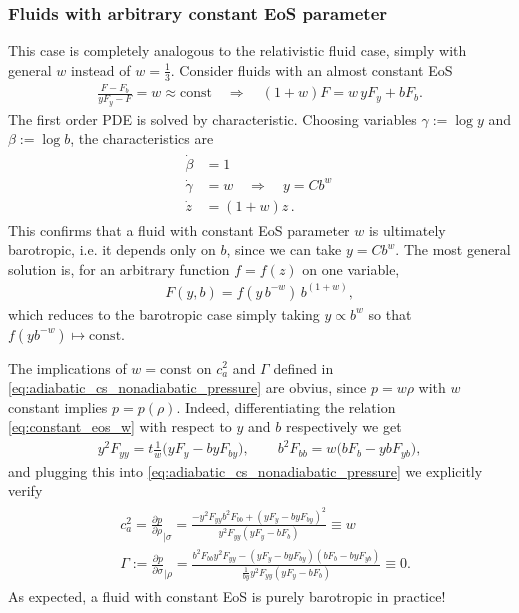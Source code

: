 \subsubsection{Fluids with arbitrary constant EoS parameter}

This case is completely analogous to the relativistic fluid case, simply with general $w$ instead of $w=\tfrac13$.
Consider fluids with an almost constant EoS
\begin{align}\label{eq:constant_eos_w}
    \frac{F-F_b}{yF_y-F}=w\approx \mathrm{const}\quad\Rightarrow\quad (1+w)F=w\, yF_y+bF_b.
\end{align}
The first order PDE is solved by characteristic.
Choosing variables $\gamma:=\log y$ and $\beta:=\log b$, the characteristics are
{\small
\begin{align}\begin{aligned}
    \dot{\beta}&=1\\
    \dot{\gamma}&=w \quad \Rightarrow\quad y = C b^w\, \\
    \dot{z}&=(1+w)z\,.
\end{aligned}\end{align}}
This confirms that a fluid with constant EoS parameter $w$ is ultimately barotropic, i.e. it depends only on $b$, since we can take $y=C b^w$.
The most general solution is, for an arbitrary function $f=f(z)$ on one variable,
\begin{align}\label{eq:constant_eos_w_solution_pde}
    F(y,b)=f(y\,b^{-w})\, b^{(1+w)}, 
\end{align}
which reduces to the barotropic case simply taking $y\propto b^w$ so that $f(yb^{-w})\mapsto \mathrm{const}$.

The implications of $w=\mathrm{const}$ on $c_a^2$ and $\Gamma$ defined in \eqref{eq:adiabatic_cs_nonadiabatic_pressure} are obvius, since $p=w\rho$ with $w$ constant implies $p=p(\rho)$.
Indeed, differentiating the relation \eqref{eq:constant_eos_w} with respect to $y$ and $b$ respectively we get
\begin{align}
    y^2F_{yy}=t\frac{1}{w}\big(yF_y-byF_{by}\big), \qquad b^2 F_{bb}=w\big(bF_b-ybF_{yb}\big),
\end{align}
and plugging this into \eqref{eq:adiabatic_cs_nonadiabatic_pressure} we explicitly verify
{\small\begin{align}
\begin{aligned}
    &c_a^2=\frac{\partial p}{\partial \rho}_{|\sigma}=\frac{-y^2F_{yy}b^2F_{bb}+(yF_y-byF_{by})^2}{y^2F_{yy}(yF_y-bF_b)} \equiv w \\[3pt]
    &\Gamma:=\frac{\partial p}{\partial \sigma}_{\mid\rho}= \frac{b^2F_{bb}y^2F_{yy}-(yF_y-byF_{by})(bF_b-byF_{yb})}{\tfrac{1}{by}y^2F_{yy}(yF_y-bF_b)}\equiv 0.
\end{aligned}
\end{align}}
As expected, a fluid with constant EoS is purely barotropic in practice!


